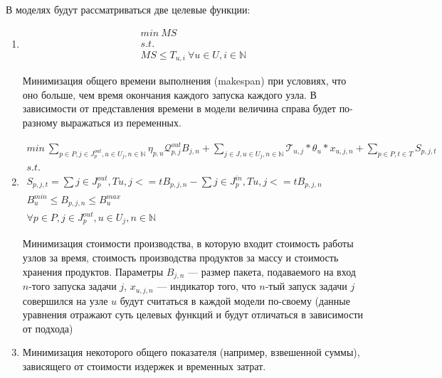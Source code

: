 \documentclass[12pt, twoside]{article}
\theoremstyle{definition}
\newcommand{\Tau}{\mathcal{T}}
\begin{document}
В моделях будут рассматриваться две целевые функции:
\begin{enumerate}
\item
\begin{equation}
\begin{gathered}
	min \: MS\\
	s.t.\\
	MS \leq T_{u, i} \: \forall u \in U, i \in \mathbb{N}
\end{gathered}
\end{equation}

Минимизация общего времени выполнения (makespan) при условиях, что оно больше, чем время окончания каждого запуска каждого узла. В зависимости от представления времени в модели величина справа будет по-разному выражаться из переменных.

\item 
\begin{equation}
\begin{gathered}
	min \: \displaystyle\sum_{p \in P, j \in J^{out}_p, u \in U_j, n \in \mathbb{N} }  \eta_{p, u} \mathcal{Q}^{out}_{p, j} B_{j, n} + \displaystyle\sum_{j \in J, u \in U_j, n \in \mathbb{N}} \Tau_{u, j}*\theta_{u}*x_{u, j, n} + \displaystyle\sum_{p \in P, t \in T} S_{p, j, t}\\
	s.t.\\
	S_{p, j, t} = \displaystyle\sum{j \in J^{out}_p, T{u, j} <= t}  B_{p, j, n} - \displaystyle\sum{j \in J^{in}_p, T{u, j} <= t}  B_{p, j, n}\\
	B^{min}_u \leq B_{p, j, n} \leq B^{max}_u \\
	 \forall p \in P, j \in J^{out}_p, u \in U_j, n \in \mathbb{N}
\end{gathered}
\end{equation}

Минимизация стоимости производства, в которую входит стоимость работы узлов за время, стоимость производства продуктов за массу и стоимость хранения продуктов. Параметры $B_{j, n}$ --- размер пакета, подаваемого на вход $n$-того запуска задачи $j$, $x_{u, j, n}$ --- индикатор того, что $n$-тый запуск задачи $j$ совершился на узле $u$ будут считаться в каждой модели по-своему (данные уравнения отражают суть целевых функций и будут отличаться в зависимости от подхода)


\item 
Минимизация некоторого общего показателя (например, взвешенной суммы), зависящего от стоимости издержек и временных затрат.

\end{enumerate}
\end{document}
